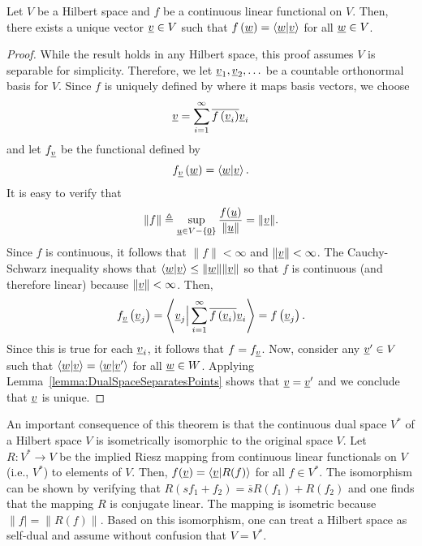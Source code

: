\begin{theorem}[Riesz] \label{theorem:FunctionalInnerProduct}
Let $V$ be a Hilbert space and $f$ be a continuous linear functional on $V$.
Then, there exists a unique vector $\underline{v} \in V$ such that $f \left( \underline{w} \right) = \left\langle \underline{w} | \underline{v} \right\rangle$ for all $\underline{w} \in V$.
\end{theorem}
\begin{proof}
While the result holds in any Hilbert space, this proof assumes $V$ is separable for simplicity.
Therefore, we let $\underline{v}_1, \underline{v}_2, \ldots$ be a countable orthonormal basis for $V$.
Since $f$ is uniquely defined by where it maps basis vectors, we choose
\begin{equation*}
\underline{v} = \sum_{i=1}^\infty \overline{f \left( \underline{v}_i \right)} \underline{v}_i
\end{equation*}
and let $f_{\underline{v}}$ be the functional defined by
\begin{equation*}
f_{\underline{v}} \left( \underline{w} \right) = \left\langle \underline{w} | \underline{v} \right\rangle .
\end{equation*}
It is easy to verify that
\[ \| f \| \triangleq \sup_{\underline{u}\in V - \{ \underline{0} \}} \frac{f(\underline{u})}{\| \underline{u} \|} = \| \underline{v} \|. \]
Since $f$ is continuous, it follows that $\| f \| < \infty$ and $\| \underline{v} \| < \infty$.
The Cauchy-Schwarz inequality shows that $\langle \underline{w} | \underline{v} \rangle \leq \| \underline{w} \| \| \underline{v} \|$ so that $f$ is continuous (and therefore linear) because $\| \underline{v} \| < \infty$.
Then, 
\begin{equation*}
f_{\underline{v}} \left( \underline{v}_j \right) = \left\langle \underline{v}_j \Big| 
\sum_{i=1}^\infty \overline{f \left( \underline{v}_i \right)} \underline{v}_i \right\rangle
= f \left( \underline{v}_j \right) .
\end{equation*}
Since this is true for each $\underline{v}_i$, it follows that $f = f_{\underline{v}}$.
Now, consider any $\underline{v}' \in V$ such that $\left\langle \underline{w} | \underline{v} \right\rangle = \left\langle \underline{w} | \underline{v}' \right\rangle$ for all $\underline{w} \in W$.
Applying Lemma~\ref{lemma:DualSpaceSeparatesPoints} shows that $\underline{v} = \underline{v}'$ and we conclude that $\underline{v}$ is unique.
\end{proof}

An important consequence of this theorem is that the continuous dual space $V^*$ of a Hilbert space $V$ is isometrically isomorphic to the original space $V$.
Let $R: V^* \rightarrow V$ be the implied Riesz mapping from continuous linear functionals on $V$ (i.e., $V^*$) to elements of $V$.
Then, $f(\underline{v}) = \langle \underline{v} | R( f ) \rangle$ for all $f \in V^*$.
The isomorphism can be shown by verifying that $R( s f_1 + f_2 ) = \overline{s} R(f_1) + R(f_2)$ and one finds that the mapping $R$ is conjugate linear.
The mapping is isometric because $\| f | = \| R(f) \|$.
Based on this isomorphism, one can treat a Hilbert space as self-dual and assume without confusion that $V=V^*$.

